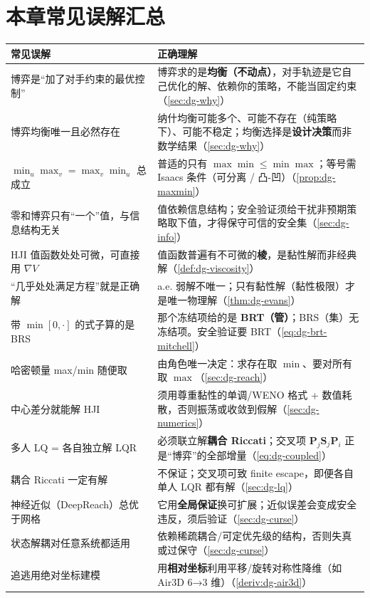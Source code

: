 \section*{本章常见误解汇总}
\begin{table}[H]\centering\small
\begin{tabular}{p{} p{}}
\toprule
\textbf{常见误解} & \textbf{正确理解} \\
\midrule
博弈是“加了对手约束的最优控制” & 博弈求的是\textbf{均衡（不动点）}，对手轨迹是它自己优化的解、依赖你的策略，不能当固定约束（\cref{sec:dg-why}） \\
博弈均衡唯一且必然存在 & 纳什均衡可能多个、可能不存在（纯策略下）、可能不稳定；均衡选择是\textbf{设计决策}而非数学结果（\cref{sec:dg-why}） \\
$\min_u\max_v=\max_v\min_u$ 总成立 & 普适的只有 $\max\min\le\min\max$；等号需 Isaacs 条件（可分离 / 凸-凹）（\cref{prop:dg-maxmin}） \\
零和博弈只有“一个”值，与信息结构无关 & 值依赖信息结构；安全验证须给干扰非预期策略取下值，才得保守可信的安全集（\cref{sec:dg-info}） \\
HJI 值函数处处可微，可直接用 $\nabla V$ & 值函数普遍有不可微的\textbf{棱}，是黏性解而非经典解（\cref{def:dg-viscosity}） \\
“几乎处处满足方程”就是正确解 & a.e. 弱解不唯一；只有黏性解（黏性极限）才是唯一物理解（\cref{thm:dg-evans}） \\
带 $\min[0,\cdot]$ 的式子算的是 BRS & 那个冻结项给的是 \textbf{BRT（管）}；BRS（集）无冻结项。安全验证要 BRT（\cref{eq:dg-brt-mitchell}） \\
哈密顿量 max/min 随便取 & 由角色唯一决定：求存在取 $\min$、要对所有取 $\max$（\cref{sec:dg-reach}） \\
中心差分就能解 HJI & 须用尊重黏性的单调/WENO 格式 + 数值耗散，否则振荡或收敛到假解（\cref{sec:dg-numerics}） \\
多人 LQ = 各自独立解 LQR & 必须联立解\textbf{耦合 Riccati}；交叉项 $\mathbf P_j\mathbf S_j\mathbf P_i$ 正是“博弈”的全部增量（\cref{eq:dg-coupled}） \\
耦合 Riccati 一定有解 & 不保证；交叉项可致 finite escape，即便各自单人 LQR 都有解（\cref{sec:dg-lq}） \\
神经近似（DeepReach）总优于网格 & 它用\textbf{全局保证}换可扩展；近似误差会变成安全违反，须后验证（\cref{sec:dg-curse}） \\
状态解耦对任意系统都适用 & 依赖稀疏耦合/可定优先级的结构，否则失真或过保守（\cref{sec:dg-curse}） \\
追逃用绝对坐标建模 & 用\textbf{相对坐标}利用平移/旋转对称性降维（如 Air3D 6→3 维）（\cref{deriv:dg-air3d}） \\
\bottomrule
\end{tabular}
\end{table}


